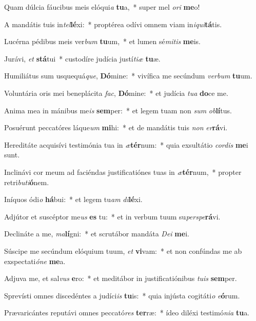 \item Quam dúlcia fáucibus meis elóqui\textit{a} \textbf{tu}a,~* super mel \textit{o}\textit{ri} \textbf{me}o!
\item A mandátis tuis in\textit{tel}\textbf{lé}xi:~* proptérea odívi omnem viam in\textit{i}\textit{qui}\textbf{tá}tis.
\item Lucérna pédibus meis ver\textit{bum} \textbf{tu}um,~* et lumen sé\textit{mi}\textit{tis} \textbf{me}is.
\item Jurávi, \textit{et} \textbf{stá}tui~* custodíre judícia justí\textit{ti}\textit{æ} \textbf{tu}æ.
\item Humiliátus sum usquequá\textit{que}, \textbf{Dó}mine:~* vivífica me secúndum \textit{ver}\textit{bum} \textbf{tu}um.
\item Voluntária oris mei beneplácita \textit{fac}, \textbf{Dó}mine:~* et judícia \textit{tu}\textit{a} \textbf{do}ce me.
\item Anima mea in mánibus me\textit{is} \textbf{sem}per:~* et legem tuam non \textit{sum} \textit{ob}\textbf{lí}tus.
\item Posuérunt peccatóres láque\textit{um} \textbf{mi}hi:~* et de mandátis tuis \textit{non} \textit{er}\textbf{rá}vi.
\item Hereditáte acquisívi testimónia tua in \textit{æ}\textbf{tér}num:~* quia exsultátio \textit{cor}\textit{dis} \textbf{me}i sunt.
\item Inclinávi cor meum ad faciéndas justificatiónes tuas in \textit{æ}\textbf{tér}num,~* propter retri\textit{bu}\textit{ti}\textbf{ó}nem.
\item Iníquos ódi\textit{o} \textbf{há}bui:~* et legem tu\textit{am} \textit{di}\textbf{lé}xi.
\item Adjútor et suscéptor me\textit{us} \textbf{es} tu:~* et in verbum tuum su\textit{per}\textit{spe}\textbf{rá}vi.
\item Declináte a me, \textit{ma}\textbf{lí}gni:~* et scrutábor mandáta \textit{De}\textit{i} \textbf{me}i.
\item Súscipe me secúndum elóquium tuum, \textit{et} \textbf{vi}vam:~* et non confúndas me ab exspectati\textit{ó}\textit{ne} \textbf{me}a.
\item Adjuva me, et sal\textit{vus} \textbf{e}ro:~* et meditábor in justificatiónibus \textit{tu}\textit{is} \textbf{sem}per.
\item Sprevísti omnes discedéntes a judíci\textit{is} \textbf{tu}is:~* quia injústa cogitáti\textit{o} \textit{e}\textbf{ó}rum.
\item Prævaricántes reputávi omnes peccató\textit{res} \textbf{ter}ræ:~* ídeo diléxi testimó\textit{ni}\textit{a} \textbf{tu}a.
